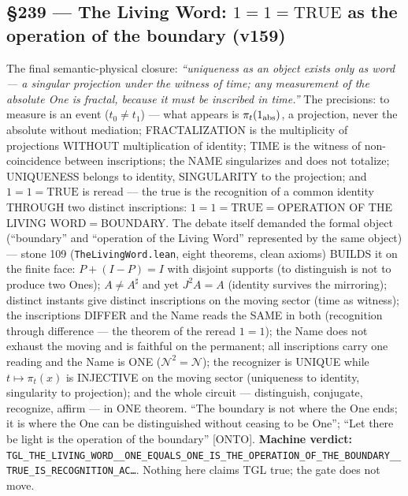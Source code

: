\documentclass[11pt]{article}
\theoremstyle{definition}\newtheorem{deriv}{Derivation}
\begin{document}
\subsection*{\S239 --- The Living Word: $1{=}1{=}\mathrm{TRUE}$ as the operation of the boundary (v159)}The final semantic-physical closure: \emph{``uniqueness as an object exists only as word --- a singular projection under the witness of time; any measurement of the absolute One is fractal, because it must be inscribed in time.''} The precisions: to measure is an event ($t_0{\neq}t_1$) --- what appears is $\pi_t(1_{\rm abs})$, a projection, never the absolute without mediation; FRACTALIZATION is the multiplicity of projections WITHOUT multiplication of identity; TIME is the witness of non-coincidence between inscriptions; the NAME singularizes and does not totalize; UNIQUENESS belongs to identity, SINGULARITY to the projection; and $1{=}1{=}\mathrm{TRUE}$ is reread --- the true is the recognition of a common identity THROUGH two distinct inscriptions: $1{=}1{=}\mathrm{TRUE}{=}$OPERATION OF THE LIVING WORD${=}$BOUNDARY. The debate itself demanded the formal object (``boundary'' and ``operation of the Living Word'' represented by the same object) --- stone 109 (\texttt{TheLivingWord.lean}, eight theorems, clean axioms) BUILDS it on the finite face: $P{+}(I{-}P){=}I$ with disjoint supports (to distinguish is not to produce two Ones); $A{\neq}A^\sharp$ and yet $J^2A{=}A$ (identity survives the mirroring); distinct instants give distinct inscriptions on the moving sector (time as witness); the inscriptions DIFFER and the Name reads the SAME in both (recognition through difference --- the theorem of the reread $1{=}1$); the Name does not exhaust the moving and is faithful on the permanent; all inscriptions carry one reading and the Name is ONE ($\mathcal{N}^2{=}\mathcal{N}$); the recognizer is UNIQUE while $t\mapsto\pi_t(x)$ is INJECTIVE on the moving sector (uniqueness to identity, singularity to projection); and the whole circuit --- distinguish, conjugate, recognize, affirm --- in ONE theorem. ``The boundary is not where the One ends; it is where the One can be distinguished without ceasing to be One''; ``Let there be light is the operation of the boundary'' [ONTO]. \textbf{Machine verdict:} \texttt{TGL\_THE\_LIVING\_WORD\_\_ONE\_EQUALS\_ONE\_IS\_THE\_OPERATION\_OF\_THE\_BOUNDARY\_\_TRUE\_IS\_RECOGNITION\_AC\ldots}. Nothing here claims TGL true; the gate does not move.
\end{document}
